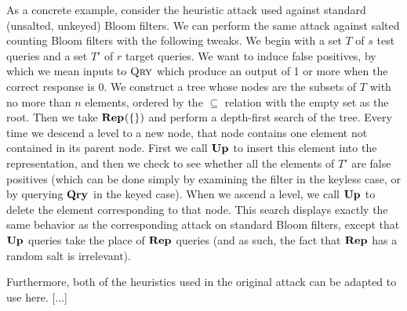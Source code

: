 As a concrete example, consider the heuristic attack used against standard (unsalted, unkeyed) Bloom filters. We can perform the same attack against salted counting Bloom filters with the following tweaks. We begin with a set $T$ of $s$ test queries and a set $T'$ of $r$ target queries. We want to induce false positives, by which we mean inputs to $\textsc{Qry}$ which produce an output of 1 or more when the correct response is 0. We construct a tree whose nodes are the subsets of $T$ with no more than $n$ elements, ordered by the $\subseteq$ relation with the empty set as the root. Then we take $\mathbf{Rep}\hspace{0.5pt}(\{\})$ and perform a depth-first search of the tree. Every time we descend a level to a new node, that node contains one element not contained in its parent node. First we call $\mathbf{Up}\hspace{0.5pt}$ to insert this element into the representation, and then we check to see whether all the elements of $T'$ are false positives (which can be done simply by examining the filter in the keyless case, or by querying $\mathbf{Qry}\hspace{0.5pt}$ in the keyed case). When we ascend a level, we call $\mathbf{Up}\hspace{0.5pt}$ to delete the element corresponding to that node. This search displays exactly the same behavior as the corresponding attack on standard Bloom filters, except that $\mathbf{Up}\hspace{0.5pt}$ queries take the place of $\mathbf{Rep}\hspace{0.5pt}$ queries (and as such, the fact that $\mathbf{Rep}\hspace{0.5pt}$ has a random salt is irrelevant).

Furthermore, both of the heuristics used in the original attack can be adapted to use here. [...]